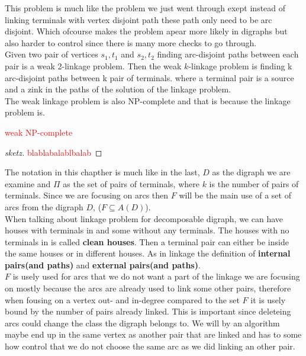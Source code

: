 This problem is much like the problem we just went through exept instead of linking terminals with vertex disjoint path these path only need to be arc disjoint.
Which ofcourse makes the problem apear more likely in digraphs but also harder to control since there is many more checks to go through. \\
Given two pair of vertices $s_1,t_1$ and $s_2,t_2$ finding arc-disjoint paths between each pair is a weak 2-linkage problem. Then the weak $k$-linkage problem is finding k arc-disjoint paths between k pair of terminals.
where a terminal  pair is a source and a zink in the paths of the solution of the linkage problem. \\
The weak linkage problem is also NP-complete and that is because the linkage problem is.
\begin{thm}
    \textcolor{red}{weak NP-complete}
\end{thm}  
\begin{proof}[sketz]
    \textcolor{red}{blablabalablbalab}
\end{proof}
The notation in this chapther is much like in the last, $D$ as the digraph we are examine and $\Pi$ as the set of pairs of terminals, where $k$ is the number of pairs of terminals. 
Since we are focusing on arcs then $F$ will be the main use of a set of arcs from the digraph $D$, ($F\subseteq A(D)$). \\
When talking about linkage problem for decomposable digraph, we can have houses with terminals in and some without any terminals. 
The houses with no terminals in is called \textbf{clean houses}.
Then a terminal pair can either be inside the same houses or in different houses. 
As in linkage the definition of \textbf{internal pairs(and paths)} and \textbf{external pairs(and paths)}.\\
$F$ is usely used for arcs that we do not want a part of the linkage we are focusing on mostly because the arcs are already used to link some other pairs, therefore when fousing on a vertex out- and in-degree compared to the set $F$ it is usely bound by the number of pairs already linked. 
This is important since deleteing arcs could change the class the digraph belongs to. 
We will by an algorithm maybe end up in the same vertex as another pair that are linked and has to some how control that we do not choose the same arc as we did linking an other pair.


